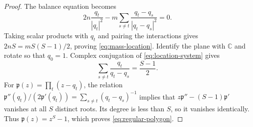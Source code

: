 \documentclass[11pt,reqno]{amsart}
\numberwithin{equation}{section}
\theoremstyle{definition}
\theoremstyle{remark}
\begin{document}
\begin{proof}
The balance equation becomes
\begin{equation}\label{eq:location-system}
 2n\frac{q_t}{|q_t|^2}
 -m\sum_{s\ne t}\frac{q_t-q_s}{|q_t-q_s|^2}=0.
\end{equation}
Taking scalar products with $q_t$ and pairing the interactions
gives $2nS=mS(S-1)/2$, proving \eqref{eq:mass-location}.
Identify the plane with $\mathbb C$ and rotate so that $q_0=1$.
Complex conjugation of \eqref{eq:location-system} gives
\begin{equation}\label{eq:complex-location}
 \sum_{s\ne t}\frac{q_t}{q_t-q_s}=\frac{S-1}{2}.
\end{equation}
For $\mathfrak p(z)=\prod_t(z-q_t)$, the relation
$\mathfrak p''(q_t)/(2\mathfrak p'(q_t))=\sum_{s\ne t}(q_t-q_s)^{-1}$ implies that
$z\mathfrak p''-(S-1)\mathfrak p'$ vanishes at all $S$ distinct roots. Its degree is
less than $S$, so it vanishes identically. Thus $\mathfrak p(z)=z^S-1$,
which proves \eqref{eq:regular-polygon}.


\end{proof}
\end{document}
